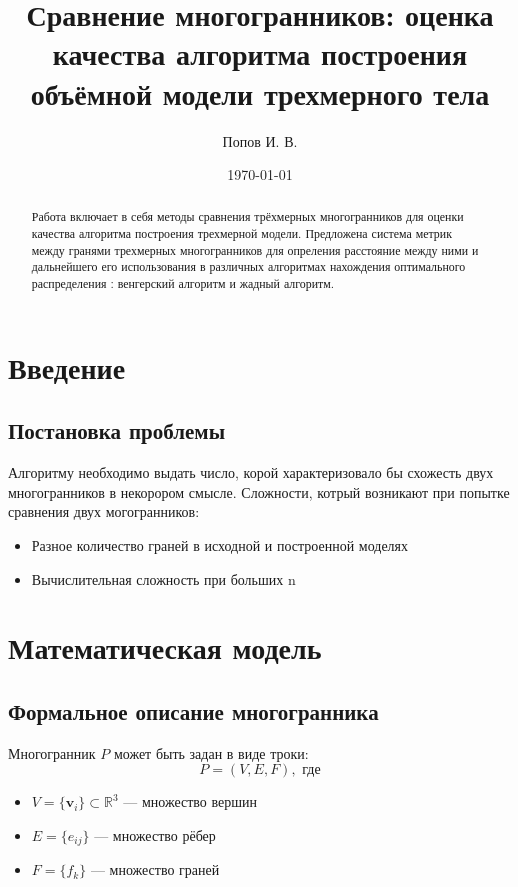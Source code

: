 \documentclass[a4paper,12pt]{article}
\title{Сравнение многогранников: оценка качества алгоритма построения объёмной модели трехмерного тела}
\author{Попов И. В.}
\date{\today}
\begin{document}
\maketitle

\begin{abstract}
Работа включает в себя методы сравнения трёхмерных многогранников для оценки качества алгоритма построения трехмерной модели.
Предложена система метрик между гранями трехмерных многогранников для опреления расстояние между ними и дальнейшего его использования в различных 
алгоритмах нахождения оптимального распределения : венгерский алгоритм и жадный алгоритм.
\end{abstract}

\section{Введение}

\subsection{Постановка проблемы}
Алгоритму необходимо выдать число, корой характеризовало бы схожесть двух многогранников в некорором смысле.
Сложности, котрый возникают при попытке сравнения двух могогранников:
\begin{itemize}
    \item Разное количество граней в исходной и построенной моделях
    \item Вычислительная сложность при больших n
\end{itemize}

\section{Математическая модель}
\subsection{Формальное описание многогранника}
Многогранник $P$ может быть задан в виде троки:
\begin{equation}
P = (V, E, F), \text{ где}
\end{equation}
\begin{itemize}
    \item $V = \{\mathbf{v}_i\} \subset \mathbb{R}^3$ — множество вершин
    \item $E = \{e_{ij}\}$ — множество рёбер
    \item $F = \{f_k\}$ — множество граней
\end{itemize}
\end{document}
